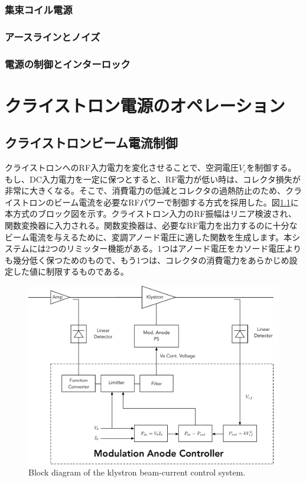 \documentclass[10pt,a4paper,book,openany]{jlreq}
\theoremstyle{definition}
\begin{document}
\subsection{集束コイル電源}

\subsection{アースラインとノイズ}
\subsection{電源の制御とインターロック}

\clearpage
\chapter{クライストロン電源のオペレーション}

\section{クライストロンビーム電流制御}

クライストロンへのRF入力電力を変化させることで、空洞電圧$V_c$を制御する。もし、DC入力電力を一定に保つとすると、RF電力が低い時は、コレクタ損失が非常に大きくなる。そこで、消費電力の低減とコレクタの過熱防止のため、クライストロンのビーム電流を必要なRFパワーで制御する方式を採用した。図\ref{mod_anode}に本方式のブロック図を示す。クライストロン入力のRF振幅はリニア検波され、関数変換器に入力される。関数変換器は、必要なRF電力を出力するのに十分なビーム電流を与えるために、変調アノード電圧に適した関数を生成します。本システムには2つのリミッター機能がある。1つはアノード電圧をカソード電圧よりも幾分低く保つためのもので、もう1つは、コレクタの消費電力をあらかじめ設定した値に制限するものである。

\begin{figure}[!htt]
    \begin{center}
        \includegraphics[width=\linewidth]{figs/Mod_Anode.pdf}
        \caption{Block diagram of the klystron beam-current control system.}
        \label{mod_anode}
    \end{center}
\end{figure}
\end{document}
